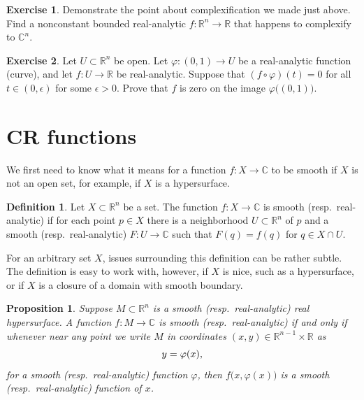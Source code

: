 \documentclass[12pt,openany]{book}
\newcommand{\avoidbreak}{\postdisplaypenalty=100}
\newcommand{\C}{{\mathbb{C}}}
\newcommand{\R}{{\mathbb{R}}}
\theoremstyle{plain}
\newtheorem{prop}[thm]{Proposition}
\theoremstyle{remark}
\theoremstyle{definition}
\newtheorem{defn}[thm]{Definition}
\newenvironment{exbox}{%
    \def\FrameCommand{\vrule width 1pt \relax\hspace{10pt}}%
    \MakeFramed{\advance\hsize-\width\FrameRestore}%
}{%
    \endMakeFramed
}
\theoremstyle{exercise}
\newtheorem{exercise}{Exercise}[section]
\theoremstyle{example}
\begin{document}
\begin{exbox}
\begin{exercise}
Demonstrate the point about complexification we made just above.
Find a nonconstant bounded real-analytic $f \colon \R^n \to \R$
that happens to complexify to $\C^n$.
\end{exercise}

\begin{exercise}
Let $U \subset \R^n$ be open.  Let $\varphi \colon (0,1) \to U$ be a
real-analytic function (curve), and let $f \colon U \to \R$ be
real-analytic.  Suppose that $(f \circ \varphi)(t) = 0$ for all $t \in
(0,\epsilon)$ for some $\epsilon > 0$.  Prove that $f$ is zero on the
image $\varphi\bigl((0,1)\bigr)$.
\end{exercise}
\end{exbox}


\section{CR functions}

We first need to know what it means for a function $f \colon X \to \C$
to be smooth if $X$ is not an open set, for example, if $X$ is a hypersurface.

\begin{defn}
Let $X \subset \R^n$ be a set.
The function $f \colon X \to \C$ is smooth (resp.\
real-analytic) if for each point $p \in X$ there is a
neighborhood $U \subset \R^n$ of $p$ and a smooth (resp.\ real-analytic) $F
\colon U \to \C$ such that $F(q) = f(q)$ for $q \in X \cap U$.
\end{defn}

For an arbitrary set $X$, issues surrounding this definition can be
rather subtle.  The definition
is easy to work with,
however, if $X$ is nice, such as a hypersurface, or if $X$ is
a closure of a domain with smooth boundary.

\begin{prop}
Suppose $M \subset \R^n$ is a smooth (resp.\ real-analytic) real hypersurface.
A function $f \colon M \to \C$
is smooth (resp.\ real-analytic) if and only if whenever near any point we write
$M$ in coordinates $(x,y) \in \R^{n-1} \times \R$ as
\begin{equation*}
y = \varphi(x) ,
\avoidbreak
\end{equation*}
for a smooth (resp.\ real-analytic) function $\varphi$, then
$f\bigl(x,\varphi(x)\bigr)$ is a smooth (resp.\ real-analytic) function of $x$.
\end{prop}
\end{document}
